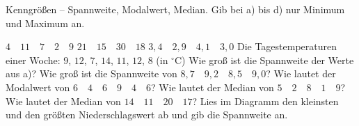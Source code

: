 \begin{aufgabe}{Kenngrößen -- Spannweite, Modalwert, Median. Gib bei a) bis d) nur Minimum und Maximum an.}
\begin{teile}
\teil $4 \quad 11 \quad 7 \quad 2 \quad 9$ \hfill {} 
\teil $21 \quad 15 \quad 30 \quad 18$ \hfill {} 
\teil $3{,}4 \quad 2{,}9 \quad 4{,}1 \quad 3{,}0$ \hfill {} 
\teil Die Tagestemperaturen einer Woche: $9$, $12$, $7$, $14$, $11$, $12$, $8$ (in $^\circ$C) \hfill {} 
\teil Wie groß ist die Spannweite der Werte aus a)? \leerfeld
\teil Wie groß ist die Spannweite von $8{,}7 \quad 9{,}2 \quad 8{,}5 \quad 9{,}0$? \leerfeld
\teil Wie lautet der Modalwert von $6 \quad 4 \quad 6 \quad 9 \quad 4 \quad 6$? \leerfeld
\teil Wie lautet der Median von $5 \quad 2 \quad 8 \quad 1 \quad 9$? \leerfeld
\teil Wie lautet der Median von $14 \quad 11 \quad 20 \quad 17$? \leerfeld
\teil Lies im Diagramm den kleinsten und den größten Niederschlagswert ab und gib die Spannweite an.
\par {}  
\end{teile}

\noindent{}
\end{aufgabe}

